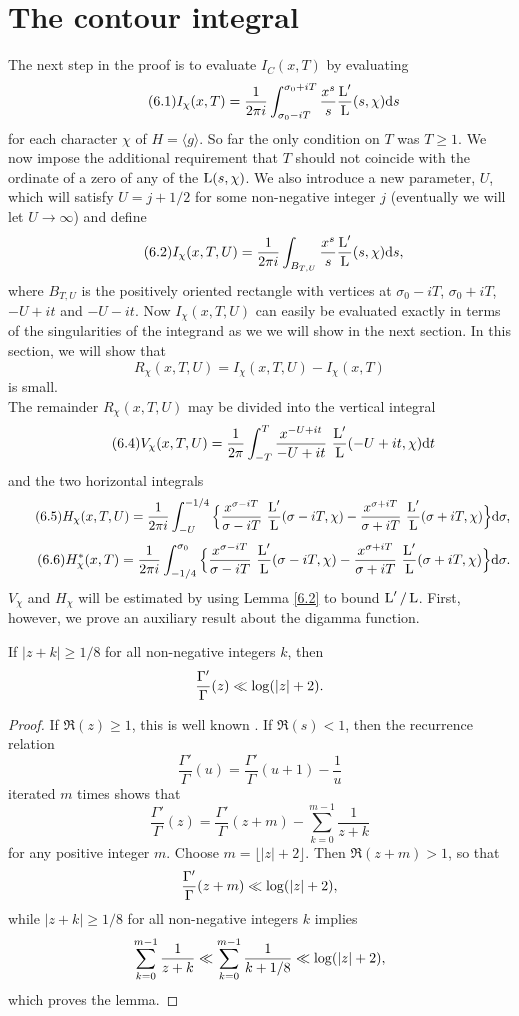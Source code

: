 \documentclass[./main]{subfiles}
\begin{document}
\section{The contour integral}\label{6}
The next step in the proof is to evaluate $I_C(x,T)$ by evaluating 
\[\tag{6.1}\label{(6.1)}I_{\chi}(x,T) = \frac{1}{2\pi i} \int_{\sigma_{0}-iT}^{\sigma_{0}+iT} \frac{x^s}{s}\frac{\operatorname{L}'}{\operatorname{L}}(s, \chi) \mathrm{d}{s}
\]
for each character $\chi$ of $H = \langle g \rangle$. So far the only condition on $T$ was $T \geq 1$. We now impose the additional requirement that $T$ should not coincide with the ordinate of a zero of any of the $\operatorname{L}(s, \chi)$. We also introduce a new parameter, $U$, which will satisfy $U = j + 1/2$ for some non-negative integer $j$ (eventually we will let $U \to \infty$) and define 
\[\tag{6.2}\label{(6.2)}I_{\chi}(x,T,U) = \frac{1}{2\pi i}\int_{B_{T,U}} \frac{x^s}{s} \frac{\operatorname{L}'}{\operatorname{L}}(s, \chi) \mathrm{d}{s},
\]
where $B_{T,U}$ is the positively oriented rectangle with vertices at $\sigma_{0}-iT$, $\sigma_{0} + iT$, $-U + it$ and $-U - it$. Now $I_{\chi}(x,T,U)$ can easily be evaluated exactly in terms of the singularities of the integrand as we we will show in the next section. In this section, we will show that 
\[\tag{6.3}\label{(6.3)} R_{\chi}(x,T,U) = I_{\chi}(x,T,U) - I_{\chi}(x,T)
\]
is small.\\
The remainder $R_{\chi}(x,T,U)$ may be divided into the vertical integral 
\[\tag{6.4}\label{(6.4)} V_{\chi}(x,T,U) = \frac{1}{2\pi} \int_{-T}^{T} \frac{x^{-U+it}}{-U+it}\,\, \frac{\operatorname{L}'}{\operatorname{L}}(-U+it, \chi) \mathrm{d}{t}
\]
and the two horizontal integrals
\[\tag{6.5}\label{(6.5)} H_{\chi}(x,T,U) = \frac{1}{2\pi i} \int_{-U}^{-1/4}\Big\{ \frac{x^{\sigma - iT}}{\sigma - iT}\,\, \frac{\operatorname{L}'}{\operatorname{L}}(\sigma - iT, \chi) - \frac{x^{\sigma + iT}}{\sigma + iT} \,\,\frac{\operatorname{L}'}{\operatorname{L}}(\sigma + iT, \chi)\Big\} \mathrm{d}{\sigma},
\]
\[\tag{6.6}\label{(6.6)} H_{\chi}^{*}(x,T) = \frac{1}{2\pi i}\int_{-1/4}^{\sigma_{0}} \Big\{\frac{x^{\sigma - iT}}{\sigma - iT}\,\, \frac{\operatorname{L}'}{\operatorname{L}}(\sigma - iT, \chi) - \frac{x^{\sigma + iT}}{\sigma + iT}\,\, \frac{\operatorname{L}'}{\operatorname{L}}(\sigma + iT, \chi)\Big\} \mathrm{d}{\sigma}. \]
$V_{\chi}$ and $H_{\chi}$ will be estimated by using Lemma \ref{6.2} to bound $\operatorname{L}'/\operatorname{L}$. First, however, we prove an auxiliary result about the digamma function.
\begin{lemma} \label{6.1}
If $|z + k | \geq 1/8$ for all non-negative integers $k$, then 
\[\frac{\Gamma'}{\Gamma}(z) \ll \log(|z| + 2)
.\]
\end{lemma}
\begin{proof}
If $\Re(z) \geq 1$, this is well known \cite[p.251]{17-whittaker1996course}. If $\Re(s) < 1$, then the recurrence relation 
\[\frac{\Gamma'}{\Gamma}(u) = \frac{\Gamma'}{\Gamma}(u+1) - \frac{1}{u}
\]
iterated $m$ times shows that
\[\frac{\Gamma'}{\Gamma}(z) = \frac{\Gamma'}{\Gamma}(z+m) - \sum_{k=0}^{m-1} \frac{1}{z+k}
\]
for any positive integer $m$. Choose $m = \lfloor|z| + 2\rfloor$. Then $\Re(z+m)>1$, so that 
\[\frac{\Gamma'}{\Gamma}(z+m) \ll \log(|z|+2),
\]
while $|z+k| \geq 1/8$ for all non-negative integers $k$ implies 
\[\sum_{k=0}^{m-1} \frac{1}{z+k} \ll \sum_{k=0}^{m-1} \frac{1}{k+1/8} \ll \log(|z| + 2)
,\]
which proves the lemma.
\end{proof}
\end{document}
